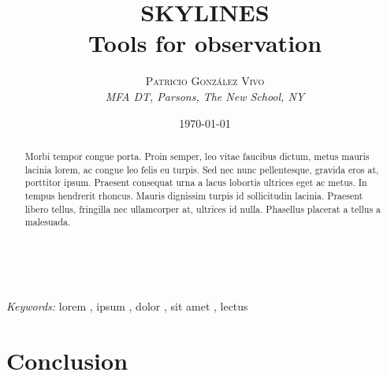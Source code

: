 \documentclass[a4paper, 11pt]{article}
\title{\textbf{SKYLINES}\\ 							%
Tools for observation} 							%
\author{\textsc{Patricio González Vivo} 				%
\\{\textit{MFA DT, Parsons, The New School, NY}}} 		%
\date{\today} 									%
\makeatletter
\renewcommand{\maketitle}{ 						%
\begin{flushright} 								%
{\LARGE\@title} 								%

\vspace{50pt} 									%

{\large\@author} 								%
\\\@date 										%

\vspace{40pt} 									%
\end{flushright}
}
\makeatother
\begin{document}
\maketitle %



\begin{abstract}
Morbi tempor congue porta. Proin semper, leo vitae faucibus dictum, metus mauris lacinia lorem, ac congue leo felis eu turpis. Sed nec nunc pellentesque, gravida eros at, porttitor ipsum. Praesent consequat urna a lacus lobortis ultrices eget ac metus. In tempus hendrerit rhoncus. Mauris dignissim turpis id sollicitudin lacinia. Praesent libero tellus, fringilla nec ullamcorper at, ultrices id nulla. Phasellus placerat a tellus a malesuada.
\end{abstract}

\hspace*{3,6mm}\textit{Keywords:} lorem , ipsum , dolor , sit amet , lectus %

\vspace{30pt} %



%


\section*{Conclusion}



%
%
%

\end{document}
